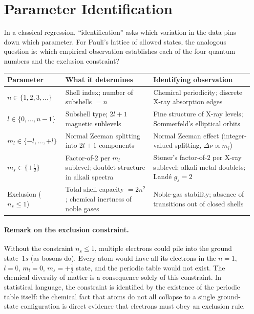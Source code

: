 \documentclass[12pt]{article}
\begin{document}
\section{Parameter Identification}
\label{sec:identification}

In a classical regression, ``identification'' asks which variation in the data
pins down which parameter.  For Pauli's lattice of allowed states, the
analogous question is: which empirical observation establishes each of the four
quantum numbers and the exclusion constraint?

\begin{center}
\begin{tabular}{p{3.8cm}p{5.5cm}p{4.5cm}}
\toprule
Parameter & What it determines & Identifying observation \\
\midrule
$n \in \{1,2,3,\ldots\}$ & Shell index; number of subshells
  $= n$ & Chemical periodicity; discrete X-ray absorption edges \\
$l \in \{0,\ldots,n-1\}$ & Subshell type; $2l+1$ magnetic sublevels
  & Fine structure of X-ray levels; Sommerfeld's elliptical orbits \\
$m_l \in \{-l,\ldots,+l\}$ & Normal Zeeman splitting into $2l+1$ components
  & Normal Zeeman effect (integer-valued splitting,
    $\Delta\nu \propto m_l$) \\
$m_s \in \{\pm\tfrac{1}{2}\}$ & Factor-of-2 per $m_l$ sublevel;
  doublet structure in alkali spectra
  & Stoner's factor-of-2 per X-ray sublevel; alkali-metal
    doublets; Landé $g_s = 2$ \\
Exclusion ($n_s \leq 1$) & Total shell capacity $= 2n^2$;
  chemical inertness of noble gases
  & Noble-gas stability; absence of transitions out of
    closed shells \\
\bottomrule
\end{tabular}
\end{center}

\paragraph{Remark on the exclusion constraint.}
Without the constraint $n_s \leq 1$, multiple electrons could pile into the
ground state~$1s$ (as bosons do).  Every atom would have all its electrons in
the $n=1$, $l=0$, $m_l=0$, $m_s=+\tfrac{1}{2}$ state, and the periodic
table would not exist.  The chemical diversity of matter is a consequence
solely of this constraint.  In statistical language, the constraint is
identified by the existence of the periodic table itself: the chemical fact
that atoms do not all collapse to a single ground-state configuration is
direct evidence that electrons must obey an exclusion rule.
\end{document}
